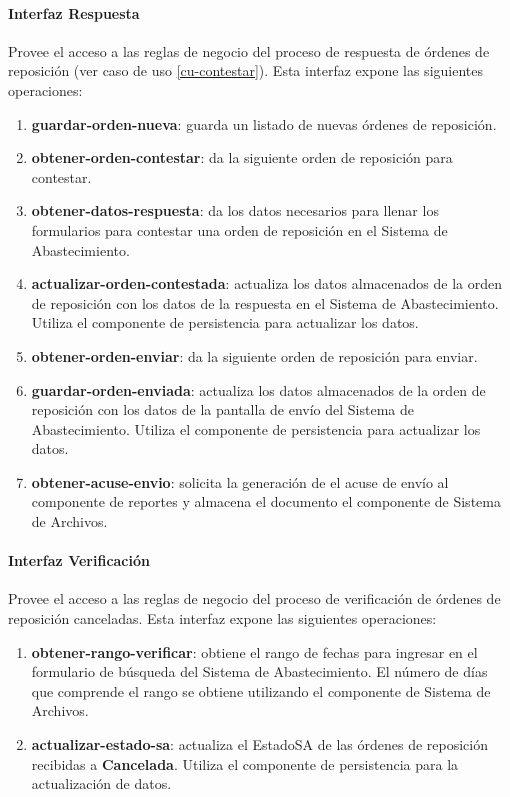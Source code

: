 \paragraph{\indent Interfaz Respuesta\\}
Provee el acceso a las reglas de negocio del proceso de respuesta de órdenes de reposición (ver caso de uso \ref{cu-contestar}). Esta interfaz expone las siguientes operaciones:
\begin{enumerate}
	\item \textbf{guardar-orden-nueva}: guarda un listado de nuevas órdenes de reposición.
	\item \textbf{obtener-orden-contestar}: da la siguiente orden de reposición para contestar.
	\item \textbf{obtener-datos-respuesta}: da los datos necesarios para llenar los formularios para contestar una orden de reposición en el Sistema de Abastecimiento.
	\item \textbf{actualizar-orden-contestada}: actualiza los datos almacenados de la orden de reposición con los datos de la respuesta en el  Sistema de Abastecimiento. Utiliza el componente de persistencia para actualizar los datos.
	\item \textbf{obtener-orden-enviar}: da la siguiente orden de reposición para enviar.
	\item \textbf{guardar-orden-enviada}: actualiza los datos almacenados de la orden de reposición con los datos de la pantalla de envío del Sistema de Abastecimiento. Utiliza el componente de persistencia para actualizar los datos.
	\item \textbf{obtener-acuse-envio}: solicita la generación de el acuse de envío al componente de reportes y almacena el documento el componente de Sistema de Archivos.
\end{enumerate}

\paragraph{\indent Interfaz Verificación\\}
Provee el acceso a las reglas de negocio del proceso de verificación de órdenes de reposición canceladas. Esta interfaz expone las siguientes operaciones:
\begin{enumerate}
	\item \textbf{obtener-rango-verificar}: obtiene el rango de fechas para ingresar en el formulario de búsqueda del Sistema de Abastecimiento. El número de días que comprende el rango se obtiene utilizando el componente de Sistema de Archivos.
	\item \textbf{actualizar-estado-sa}: actualiza el EstadoSA de las órdenes de reposición recibidas a \textbf{Cancelada}. Utiliza el componente de persistencia para la actualización de datos.
\end{enumerate}

